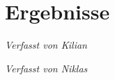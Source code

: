 \documentclass[../main.tex]{subfiles}
\begin{document}
\chapter{Ergebnisse}
\vspace{-0.5cm}
\noindent\textit{\small Verfasst von Kilian}
\vspace{0.5cm}


\vspace{-0.5cm}
\noindent\textit{\small Verfasst von Niklas}
\vspace{0.5cm}
\end{document}
